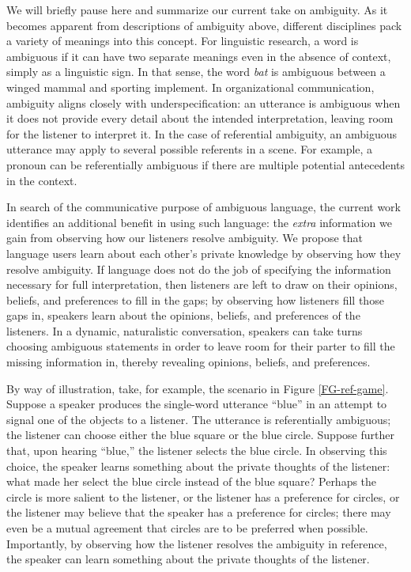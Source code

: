 \documentclass[10pt,a4paper]{article}
\begin{document}
We will briefly pause here and summarize our current take on ambiguity. As it becomes apparent from descriptions of ambiguity above, different disciplines pack a variety of meanings into this concept. For linguistic research, a word is ambiguous if it can have two separate meanings even in the absence of context, simply as a linguistic sign. In that sense, the word \textit{bat} is ambiguous between a winged mammal and sporting implement. In organizational communication, ambiguity aligns closely with underspecification: an utterance is ambiguous when it does not provide every detail about the intended interpretation, leaving room for the listener to interpret it. In the case of referential ambiguity, an ambiguous utterance may apply to several possible referents in a scene. For example, a pronoun can be referentially ambiguous if there are multiple potential antecedents in the context.


In search of the communicative purpose of ambiguous language, the current work identifies an additional benefit in using such language: the \emph{extra} information we gain from observing how our listeners resolve ambiguity.
We propose that language users learn about each other's private knowledge by observing how they resolve ambiguity. If language does not do the job of specifying the information necessary for full interpretation, then listeners are left to draw on their opinions, beliefs, and preferences to fill in the gaps; by observing how listeners fill those gaps in, speakers learn about the opinions, beliefs, and preferences of the listeners.
In a dynamic, naturalistic conversation, speakers can take turns choosing ambiguous statements in order to leave room for their parter to fill the missing information in, thereby revealing opinions, beliefs, and preferences. 


By way of illustration, take, for example, the scenario in Figure \ref{FG-ref-game}. Suppose a speaker produces the single-word utterance ``blue'' in an attempt to signal one of the objects to a listener. The utterance is referentially ambiguous; the listener can choose either the blue square or the blue circle. Suppose further that, upon hearing ``blue,'' the listener selects the blue circle. In observing this choice, the speaker learns something about the private thoughts of the listener: what made her select the blue circle instead of the blue square? Perhaps the circle is more salient to the listener, or the listener has a preference for circles, or the listener may believe that the speaker has a preference for circles; there may even be a mutual agreement that circles are to be preferred when possible. Importantly, by observing how the listener resolves the ambiguity in reference, the speaker can learn something about the private thoughts of the listener. 
\end{document}
